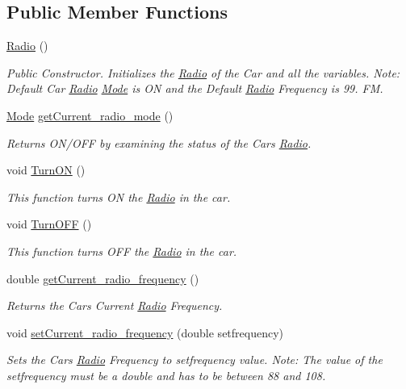 \subsection*{Public Member Functions}
\begin{DoxyCompactItemize}
\item 
\hyperlink{class_radio_aa5f5b6b5d34981b50128757a27d9ee0c}{Radio} ()
\begin{DoxyCompactList}\small\item\em Public Constructor. Initializes the \hyperlink{class_radio}{Radio} of the Car and all the variables. Note\+: Default Car \hyperlink{class_radio}{Radio} \hyperlink{enum_radio_1_1_mode}{Mode} is O\+N and the Default \hyperlink{class_radio}{Radio} Frequency is 99. F\+M. \end{DoxyCompactList}\item 
\hyperlink{enum_radio_1_1_mode}{Mode} \hyperlink{class_radio_aa1e69a2dd5cb50a8401ae4a0e4908029}{get\+Current\+\_\+radio\+\_\+mode} ()
\begin{DoxyCompactList}\small\item\em Returns O\+N/\+O\+F\+F by examining the status of the Car\textquotesingle{}s \hyperlink{class_radio}{Radio}. \end{DoxyCompactList}\item 
void \hyperlink{class_radio_a356f66f2b96663f03a99463703de77de}{Turn\+O\+N} ()
\begin{DoxyCompactList}\small\item\em This function turns O\+N the \hyperlink{class_radio}{Radio} in the car. \end{DoxyCompactList}\item 
void \hyperlink{class_radio_adf335ca72244b255cc5780e6f11304dd}{Turn\+O\+F\+F} ()
\begin{DoxyCompactList}\small\item\em This function turns O\+F\+F the \hyperlink{class_radio}{Radio} in the car. \end{DoxyCompactList}\item 
double \hyperlink{class_radio_a9484c6f8d4037a54c99dfeaf15a69a9f}{get\+Current\+\_\+radio\+\_\+frequency} ()
\begin{DoxyCompactList}\small\item\em Returns the Car\textquotesingle{}s Current \hyperlink{class_radio}{Radio} Frequency. \end{DoxyCompactList}\item 
void \hyperlink{class_radio_a3308d52d31a7f3eddfb60cb51ff75cd1}{set\+Current\+\_\+radio\+\_\+frequency} (double setfrequency)
\begin{DoxyCompactList}\small\item\em Sets the Car\textquotesingle{}s \hyperlink{class_radio}{Radio} Frequency to setfrequency value. Note\+: The value of the setfrequency must be a double and has to be between 88 and 108. \end{DoxyCompactList}\end{DoxyCompactItemize}


